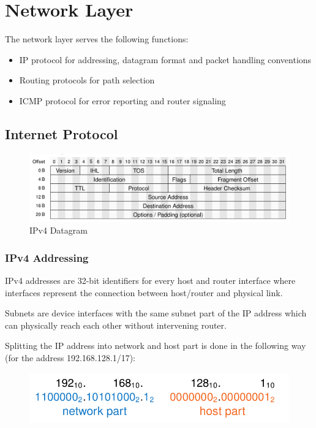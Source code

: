 
\section{Network Layer}
The network layer serves the following functions:
\begin{itemize}
  \item IP protocol for addressing, datagram format and packet handling conventions
  \item Routing protocols for path selection
  \item ICMP protocol for error reporting and router signaling
\end{itemize}

\subsection{Internet Protocol}
\begin{figure}[H]
  \centering
  \includegraphics[width=.8\textwidth]{figures/ipv4_datagram.png}
  \caption{IPv4 Datagram}\label{fig:ipv4_datagram}
\end{figure}

\subsubsection*{IPv4 Addressing}
IPv4 addresses are 32-bit identifiers for every host and router interface where interfaces represent the connection between host/router and physical link.

Subnets are device interfaces with the same subnet part of the IP address which can physically reach each other without intervening router.

Splitting the IP address into network and host part is done in the following way (for the address 192.168.128.1/17):
\begin{figure}[H]
  \centering
  \includegraphics[width=.6\textwidth]{figures/ip_split.png}
\end{figure}

